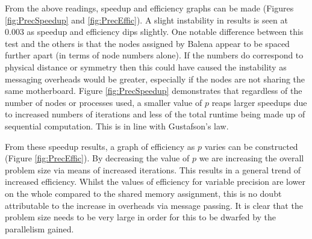 \documentclass[11pt]{article}
\begin{document}
From the above readings, speedup and efficiency graphs can be made (Figures \ref{fig:PrecSpeedup} and \ref{fig:PrecEffic}). 
A slight instability in results is seen at 0.003 as speedup and efficiency dips slightly. One notable difference between this test and the others is that the nodes assigned by Balena appear to be spaced further apart (in terms of node numbers alone). If the numbers do correspond to physical distance or symmetry then this could have caused the instability as messaging overheads would be greater, especially if the nodes are not sharing the same motherboard.  Figure \ref{fig:PrecSpeedup} demonstrates that regardless of the number of nodes or processes used, a smaller value of $p$ reaps larger speedups due to increased numbers of iterations and less of the total runtime being made up of sequential computation. This is in line with Gustafson's law.

From these speedup results, a graph of efficiency as $p$ varies can be constructed (Figure \ref{fig:PrecEffic}). By decreasing the value of $p$ we are increasing the overall problem size via means of increased iterations. This results in a general trend of increased efficiency. Whilst the values of efficiency for variable precision are lower on the whole compared to the shared memory assignment, this is no doubt attributable to the increase in overheads via message passing. It is clear that the problem size needs to be very large in order for this to be dwarfed by the parallelism gained.
\end{document}
